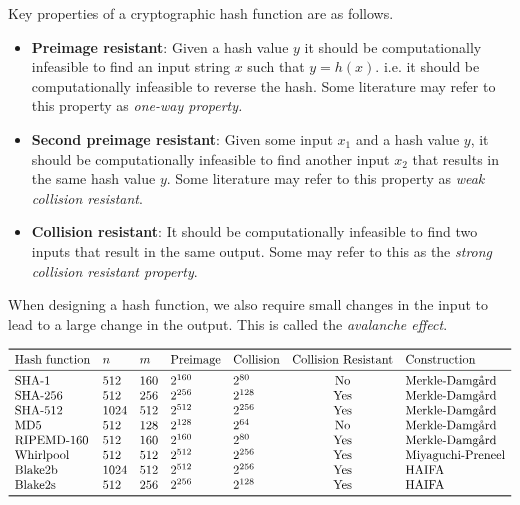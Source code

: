 Key properties of a cryptographic hash function are as follows.
\begin{itemize}
    \item \textbf{Preimage resistant}: Given a hash value $y$ it should be computationally infeasible to find an input string $x$ such that $y = h(x)$. i.e. it should be computationally infeasible to reverse the hash. Some literature may refer to this property as \textit{one-way property.}
    
    \item \textbf{Second preimage resistant}: Given some input $x_1$ and a hash value $y$, it should be computationally infeasible to find another input $x_2$ that results in the same hash value $y$. Some literature may refer to this property as \textit{weak collision resistant}.
    
    \item \textbf{Collision resistant}: It should be computationally infeasible to find two inputs that result in the same output. Some may refer to this as the \textit{strong collision resistant property}.
\end{itemize}

When designing a hash function, we also require small changes in the input to lead to a large change in the output. This is called the \textit{avalanche effect}.

\begin{table}[t]
    \centering
    \caption{Overview of various hash functions and their key parameters. $n$ is block size in bits and $m$ is output size in bits.}
    \label{tab:hash-functions}
    $$
    \begin{array}{lllllcl}
    \toprule
    \text{Hash function} & n & m & \text{Preimage} & \text{Collision} & \text{Collision Resistant} & \text{Construction} \\
    \midrule
    \text{SHA-1} & 512 & 160 & 2^{160} & 2^{80} & \text{No} & \text{Merkle-Damgård} \\
    \text{SHA-256} & 512 & 256 & 2^{256} & 2^{128} & \text{Yes} & \text{Merkle-Damgård} \\
    \text{SHA-512} & 1024 & 512 & 2^{512} & 2^{256} & \text{Yes} & \text{Merkle-Damgård} \\
    \text{MD5} & 512 & 128 & 2^{128} & 2^{64} & \text{No} & \text{Merkle-Damgård} \\
    \text{RIPEMD-160} & 512 & 160 & 2^{160} & 2^{80} & \text{Yes} & \text{Merkle-Damgård} \\
    \text{Whirlpool} & 512 & 512 & 2^{512} & 2^{256} & \text{Yes} & \text{Miyaguchi-Preneel} \\
    \text{Blake2b} & 1024 & 512 & 2^{512} & 2^{256} & \text{Yes} & \text{HAIFA} \\
    \text{Blake2s} & 512 & 256 & 2^{256} & 2^{128} & \text{Yes} & \text{HAIFA} \\
    \bottomrule
    \end{array}
    $$
\end{table}

